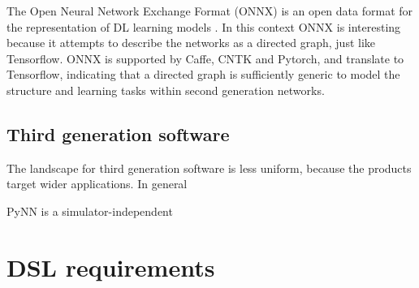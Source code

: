 \documentclass[report.tex]{subfiles}
\begin{document}
The Open Neural Network Exchange Format (ONNX) is an open data format for the representation
of \gls{DL} learning models \cite{ONNX2018}. 
In this context ONNX is interesting because it attempts to describe the networks as 
a directed graph, just like Tensorflow.
ONNX is supported by Caffe, CNTK and Pytorch, and translate to Tensorflow,
indicating that a directed graph is 
sufficiently generic to model the structure and learning tasks within 
second generation networks.

\subsection{Third generation software}
The landscape for third generation software is less uniform, because the products target
wider applications.
In general 


PyNN is a simulator-independent

\section{DSL requirements} \label{sec:requirements}






\end{document}
